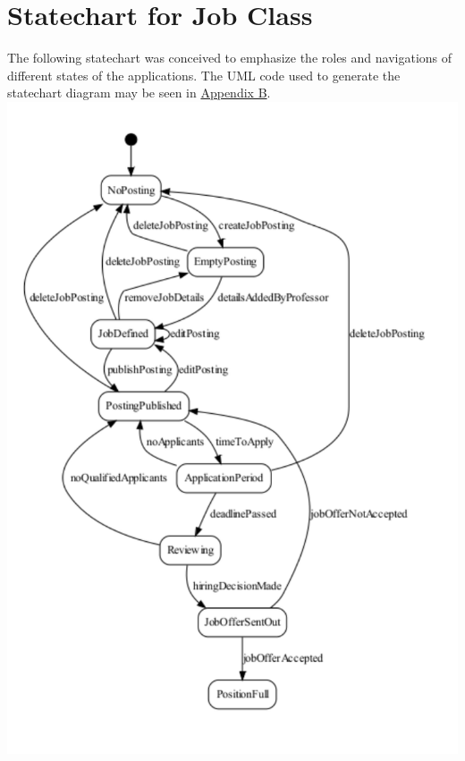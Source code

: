 \documentclass[12pt,openany]{report}
\begin{document}
\chapter{Statechart for Job Class}
The following statechart was conceived to emphasize the roles and navigations of different states of
the applications. The UML code used to generate the statechart diagram may be seen in
\hyperref[appB]{Appendix B}.\\
\includegraphics[scale=0.9]{model/Diagrams/StateDiagram/StateChartDiagram.pdf}
\end{document}
